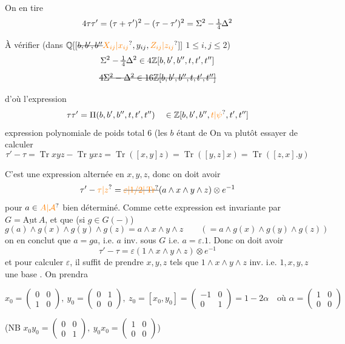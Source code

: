 On en tire
\[
 4\tau\tau'=(\tau+\tau')^2-(\tau-\tau')^2=\Sigma^2-\deleted{\tfrac14}\Delta^2
\]

À vérifier (dans $\mathbb Q[[\deleted{b,b',b''}\unsure{X_{ij}|x_{ij}},y_{ij},\unsure{Z_{ij}|z_{ij}}]]$ \quad $1\leq i,j\leq2$)
\[
 \Sigma^2-\deleted{\tfrac14}\Delta^2\in4\mathbb Z[b,b',b'',t,t',t'']
\]
\[
 \deleted{4\Sigma^2-\Delta^2\in16\mathbb Z[b,b',b'',t,t',t'']}
\]

d'où l'expression
\[
 \tau\tau'=\Pi(b,b',b'',t,t',t'')\quad\in\mathbb Z[b,b',b'',\unsure{t|\psi},t',t'']
\]
expression polynomiale de poids total $6$ (les $b$ étant de
On va plutôt essayer de calculer
\[
 \tau'-\tau=\operatorname{Tr}xyz-\operatorname{Tr}yxz=\operatorname{Tr}([x,y]z)=\operatorname{Tr}([y,z]x)=\operatorname{Tr}([z,x].y)
\]

C'est une expression  alternée en $x,y,z$, donc on doit avoir
\[
 \tau'-\unsure{\tau|z}=\deleted{\unsure{\varepsilon|1/2|\operatorname{Tr}}}(a\wedge x\wedge y\wedge z)\otimes e^{-1}
\]
pour $a\in\unsure{A|\mathcal A}$ bien déterminé. Comme cette expression est invariante par $G=\underline{\mathrm{Aut}}\,A$,  et que (si $g\in G(-)$)
\[
 g(a)\wedge g(x)\wedge g(y)\wedge g(z)=a\wedge x\wedge y\wedge z\qquad(=a\wedge g(x)\wedge g(y)\wedge g(z))
\]
on en conclut que $a=ga$, i.e. $a$ inv. sous $G$ i.e. $a=\varepsilon.1$. Donc on doit avoir
\[
 \tau'-\tau=\varepsilon(1\wedge x\wedge y\wedge z)\otimes e^{-1}
\]
et pour calculer $\varepsilon$, il suffit de prendre $x,y,z$ tels que $1\wedge x\wedge y\wedge z$ inv. i.e. $1,x,y,z$ une base . On prendra

\[
 x_0=\begin{pmatrix}0&0\\1&0\end{pmatrix},\ y_0=\begin{pmatrix}0&1\\0&0\end{pmatrix},\ z_0=[x_0,y_0]=\begin{pmatrix}-1&0\\0&1\end{pmatrix}=1-2\alpha
 \quad\text{où }\alpha=\begin{pmatrix}1&0\\0&0\end{pmatrix}
\]

(NB \(\displaystyle x_0y_0=\begin{pmatrix}0&0\\0&1\end{pmatrix},\ y_0x_0=\begin{pmatrix}1&0\\0&0\end{pmatrix}\))

